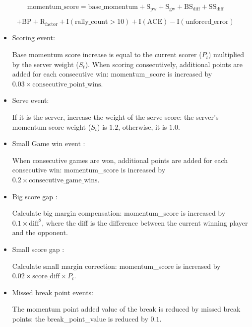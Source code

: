\documentclass{mcmthesis}  %
\begin{document}
\begin{equation}
\text{momentum\_score} = \text{base\_momentum} + \text{S}_{\text{pw}} + \text{S}_{\text{gw}} + \text{BS}_{\text{diff}} + \text{SS}_{\text{diff}} \nonumber
\end{equation}

\begin{equation}
+ \text{BP} + \text{R}_{\text{factor}} + \text{I}(\text{rally\_count} > 10) + \text{I}(\text{ACE}) - \text{I}(\text{unforced\_error})
\end{equation}\nonumber
\begin{itemize}
\item Scoring event:\par

Base momentum score increase is equal to the current scorer ($P_t$) multiplied by the server weight ($S_t$).
When scoring consecutively, additional points are added for each consecutive win: momentum\_score is increased by $0.03 \times \text{consecutive\_point\_wins}$.

\item  Serve event:\par

If it is the server, increase the weight of the serve score: the server's momentum score weight ($S_t$) is $1.2$, otherwise, it is $1.0$.

\item Small Game win event :\par

When consecutive games are won, additional points are added for each consecutive win: momentum\_score is increased by $0.2 \times \text{consecutive\_game\_wins}$.

\item Big score gap :\par

Calculate big margin compensation: momentum\_score is increased by $0.1 \times \text{diff}^2$, where the diff is the difference between the current winning player and the opponent.

\item Small score gap :\par

Calculate small margin correction: momentum\_score is increased by $0.02 \times \text{score\_diff} \times P_t$.

\item  Missed break point events:\par

The momentum point added value of the break is reduced by missed break points: the break\_point\_value is reduced by $0.1$.


\end{itemize}
\end{document}
